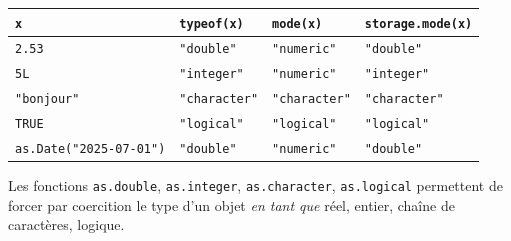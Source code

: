 \documentclass[
]{book}
\newcounter{none} %
\begin{document}
{\def\LTcaptype{none} %
\begin{longtable}[]{@{}
  >{\centering\arraybackslash}p{}
  >{\centering\arraybackslash}p{}
  >{\centering\arraybackslash}p{}
  >{\centering\arraybackslash}p{}@{}}
\toprule\noalign{}
\begin{minipage}[b]{\linewidth}\centering
\texttt{x}
\end{minipage} & \begin{minipage}[b]{\linewidth}\centering
\texttt{typeof(x)}
\end{minipage} & \begin{minipage}[b]{\linewidth}\centering
\texttt{mode(x)}
\end{minipage} & \begin{minipage}[b]{\linewidth}\centering
\texttt{storage.mode(x)}
\end{minipage} \\
\midrule\noalign{}
\endhead
\bottomrule\noalign{}
\endlastfoot
\texttt{2.53} & \texttt{"double"} & \texttt{"numeric"} & \texttt{"double"} \\
\texttt{5L} & \texttt{"integer"} & \texttt{"numeric"} & \texttt{"integer"} \\
\texttt{"bonjour"} & \texttt{"character"} & \texttt{"character"} & \texttt{"character"} \\
\texttt{TRUE} & \texttt{"logical"} & \texttt{"logical"} & \texttt{"logical"} \\
\texttt{as.Date("2025-07-01")} & \texttt{"double"} & \texttt{"numeric"} & \texttt{"double"} \\
\end{longtable}
}

Les fonctions \texttt{as.double}, \texttt{as.integer}, \texttt{as.character}, \texttt{as.logical} permettent de forcer par coercition le type d'un objet \emph{en tant que} réel, entier, chaîne de caractères, logique.
\end{document}
